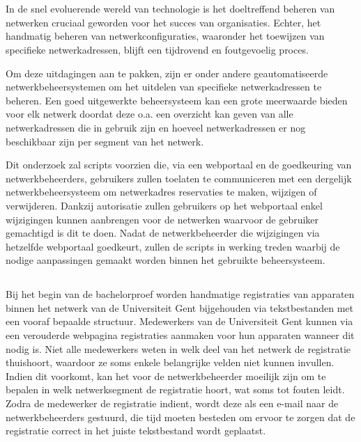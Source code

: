 
\chapter{}%
\label{ch:inleiding}
In de snel evoluerende wereld van technologie is het doeltreffend beheren van netwerken cruciaal geworden voor het succes van organisaties. Echter, het handmatig beheren van netwerkconfiguraties, waaronder het toewijzen van specifieke netwerkadressen, blijft een tijdrovend en foutgevoelig proces.

Om deze uitdagingen aan te pakken, zijn er onder andere geautomatiseerde netwerkbeheersystemen om het uitdelen van specifieke netwerkadressen te beheren. Een goed uitgewerkte beheersysteem kan een grote meerwaarde bieden voor elk netwerk doordat deze o.a. een overzicht kan geven van alle netwerkadressen die in gebruik zijn en hoeveel netwerkadressen er nog beschikbaar zijn per segment van het netwerk.

Dit onderzoek zal scripts voorzien die, via een webportaal en de goedkeuring van netwerkbeheerders, gebruikers zullen toelaten te communiceren met een dergelijk netwerkbeheersysteem om netwerkadres reservaties te maken, wijzigen of verwijderen. Dankzij autorisatie zullen gebruikers op het webportaal enkel wijzigingen kunnen aanbrengen voor de netwerken waarvoor de gebruiker gemachtigd is dit te doen. Nadat de netwerkbeheerder die wijzigingen via hetzelfde webportaal goedkeurt, zullen de scripts in werking treden waarbij de nodige aanpassingen gemaakt worden binnen het gebruikte beheersysteem.

\section{}%
\label{sec:probleemstelling}
Bij het begin van de bachelorproef worden handmatige registraties van apparaten binnen het netwerk van de Universiteit Gent bijgehouden via tekstbestanden met een vooraf bepaalde structuur. Medewerkers van de Universiteit Gent kunnen via een verouderde webpagina registraties aanmaken voor hun apparaten wanneer dit nodig is. Niet alle medewerkers weten in welk deel van het netwerk de registratie thuishoort, waardoor ze soms enkele belangrijke velden niet kunnen invullen. Indien dit voorkomt, kan het voor de netwerkbeheerder moeilijk zijn om te bepalen in welk netwerksegment de registratie hoort, wat soms tot fouten leidt. Zodra de medewerker de registratie indient, wordt deze als een e-mail naar de netwerkbeheerders gestuurd, die tijd moeten besteden om ervoor te zorgen dat de registratie correct in het juiste tekstbestand wordt geplaatst.

